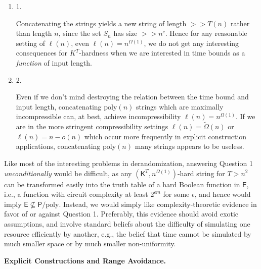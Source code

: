 \begin{enumerate}


\item[] 
1. 


Concatenating the strings yields a new string of length $>>T(n)$ rather than length $n$, since the set $S_{n}$ has size $>>n^{c}$. Hence for any reasonable setting of $\ell(n)$, even $\ell(n)=n^{\Omega(1)}$, we do not get any interesting consequences for $K^{T}$-hardness when we are interested in time bounds as a \emph{function} of input length.\par





\item[] 
2. 


Even if we don’t mind destroying the relation between the time bound and input length, concatenating $\mathrm{poly}(n)$ strings which are maximally incompressible can, at best, achieve incompressibility $\ell(n)=n^{\Omega(1)}$. If we are in the more stringent compressibility settings $\ell(n)=\tilde{\Omega}(n)$ or $\ell(n)=n-o(n)$ which occur more frequently in explicit construction applications, concatenating $\mathrm{poly}(n)$ many strings appears to be useless.\par





\end{enumerate}




Like most of the interesting problems in derandomization, answering Question 1 \emph{unconditionally} would be difficult, as any $({\mathsf{K}}^{T},n^{\Omega(1)})$-hard string for $T>n^{2}$ can be transformed easily into the truth table of a hard Boolean function in ${\mathsf{E}}$, i.e., a function with circuit complexity at least $2^{\epsilon m}$ for some $\epsilon$, and hence would imply ${\mathsf{E}}\not\subseteq{\mathsf{P}}/\mathrm{poly}$.
Instead, we would simply like complexity-theoretic evidence in favor of or against Question 1. Preferably, this evidence should avoid exotic assumptions, and involve standard beliefs about the difficulty of simulating one resource efficiently by another, e.g., the belief that time cannot be simulated by much smaller space or by much smaller non-uniformity.\par





\par\medskip\noindent\textbf{Explicit Constructions and Range Avoidance.}\par




